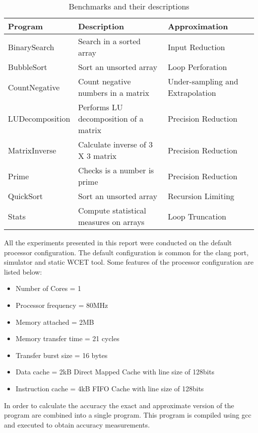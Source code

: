 \begin{table}[]
  \centering
  \caption{Benchmarks and their descriptions}
  \label{description}
  \begin{tabular}{|l|l|l|}
    \hline
    \textbf{Program} & \textbf{Description}                   & \textbf{Approximation}           \\ \hline
    BinarySearch     & Search in a sorted array               & Input Reduction                  \\ \hline
    BubbleSort       & Sort an unsorted array                 & Loop Perforation                 \\ \hline
    CountNegative    & Count negative numbers in a matrix     & Under-sampling and Extrapolation \\ \hline
    LUDecomposition  & Performs LU decomposition of a matrix  & Precision Reduction              \\ \hline
    MatrixInverse    & Calculate inverse of 3 X 3 matrix      & Precision Reduction              \\ \hline
    Prime            & Checks is a number is prime            & Precision Reduction              \\ \hline
    QuickSort        & Sort an unsorted array                 & Recursion Limiting               \\ \hline
    Stats            & Compute statistical measures on arrays & Loop Truncation                  \\ \hline
  \end{tabular}
\end{table}

All the experiments presented in this report were conducted on the default processor configuration. The default configuration is common for the clang port, simulator and static WCET tool. Some features of the processor configuration are listed below:
\begin{itemize}
\item Number of Cores = 1
\item Processor frequency = 80MHz
\item Memory attached = 2MB
\item Memory transfer time = 21 cycles
\item Transfer burst size = 16 bytes
\item Data cache = 2kB Direct Mapped Cache with line size of 128bits
\item Instruction cache = 4kB FIFO Cache with line size of 128bits
\end{itemize}

In order to calculate the accuracy the exact and approximate version of the program are combined into a single program. This program is compiled using gcc and executed to obtain accuracy measurements.

